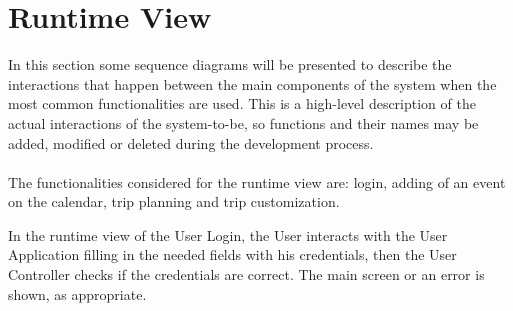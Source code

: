 \section{Runtime View}
In this section some sequence diagrams will be presented to describe the interactions that happen between the main components of the system when the most common functionalities are used. This is a high-level description of the actual interactions of the system-to-be, so functions and their names may be added, modified or deleted during the development process.
\\
\\
The functionalities considered for the runtime view are: login, adding of an event on the calendar, trip planning and trip customization.

\pagebreak
\begin{landscape}
\begin{center}
\thispagestyle{empty}
\end{center}
\end{landscape}

In the runtime view of the User Login, the User interacts with the User Application filling in the needed fields with his credentials, then the User Controller checks if the credentials are correct. The main screen or an error is shown, as appropriate.

\pagebreak
\begin{landscape}
\begin{center}
\thispagestyle{empty}
\end{center}
\end{landscape}

